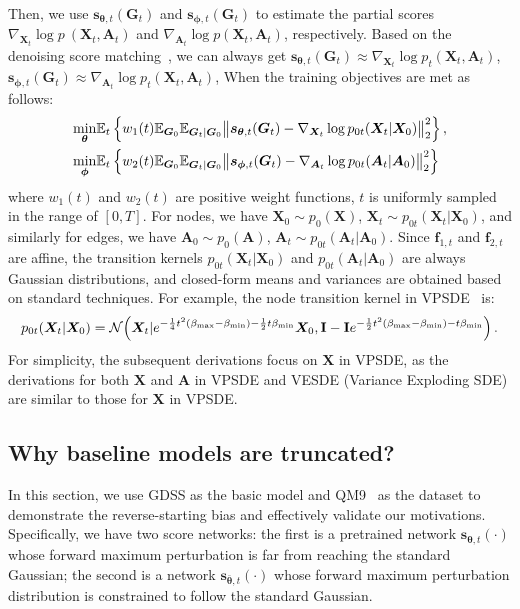 \documentclass{article}
\newcommand{\s}{{{\bm s}}}
\newcommand{\X}{{{\bm X}}}
\newcommand{\A}{{{\bm A}}}
\newcommand{\G}{{{\bm G}}}
\newcommand{\PHI}{{\bm\phi}}
\newcommand{\THETA}{{\bm\theta}}
\begin{document}
Then, we use $\s_{\THETA,t}(\G_{t})$ and $\s_{\PHI,t}(\G_{t})$ to estimate the partial scores $\nabla_{\X_t}\log p~\left(\X_t,{\A}_t\right)$ and $\nabla_{{\A}_t}\log p\left(\X_t,{\A}_t\right)$, respectively. Based on the denoising score matching~\citep{vincent2011connection,song2021scorebased}, we can always get $\s_{\THETA,t}(\G_{t})\approx\nabla_{\X_{t}}\log p_{t}(\X_{t},\A_t)$, $\s_{\PHI,t}(\G_{t})\approx\nabla_{{\A}_{t}}\log p_{t}(\X_{t},\A_t)$, When the training objectives are met as follows:
\begin{equation}
\begin{aligned}
\min_{\THETA} 
&\mathbb{E}_{t}\, \Bigl\{ w_{1}(t) \mathbb{E}_{\G_{0}} \mathbb{E}_{\G_{t}|\G_{0}} \bigl\| \s_{\THETA,t}(\G_{t}) - \nabla_{\X_{t}} \log p_{0t}(\X_{t}|\X_{0}) \bigr\|_{2}^{2} \Bigr\}\,,\\
\min_{\PHI} 
&\mathbb{E}_{t}\, \Bigl\{ w_{2}(t) \mathbb{E}_{\G_{0}} \mathbb{E}_{\G_{t}|\G_{0}} \bigl\| \s_{\PHI,t}(\G_{t}) - \nabla_{{\A}_{t}} \log p_{0t}({\A}_{t}|{\A}_{0}) \bigr\|_{2}^{2} \Bigr\}
\end{aligned}
\label{eq:combined}
\end{equation}
where $w_{1}(t)$ and $w_{2}(t)$ are positive weight functions, $t$ is uniformly sampled in the range of $[0,T]$. For nodes, we have $\X_{0} \sim p_{0}(\X)$, $\X_{t} \sim p_{0t}(\X_{t}|\X_{0})$, and similarly for edges, we have ${\A}_{0} \sim p_{0}({\A})$, ${\A}_{t} \sim p_{0t}({\A}_{t}|{\A}_{0})$. Since $\mathbf{f}_{1,t}$ and $\mathbf{f}_{2,t}$ are affine, the transition kernels $p_{0t}(\X_{t}|\X_{0})$ and $p_{0t}({\A}_{t}|{\A}_{0})$ are always Gaussian distributions, and closed-form means and variances are obtained based on standard techniques. For example, the node transition kernel in VPSDE~\citep{song2021scorebased} is:
\begin{align}
p_{0t}(\X_t | \X_0) 
= \mathcal{N}
\Bigl(\X_t| e^{-\frac14t^2(\beta_{\max}-\beta_{\min}) 
- \frac12t\beta_{\min}}\X_0, 
\mathbf{I} - \mathbf{I}e^{-\frac12t^2(\beta_{\max}
-\beta_{\min}) - t\beta_{\min}}\Bigr)\,.
\label{eq:vp perturbation kernel}
\end{align}
For simplicity, the subsequent derivations focus on $\X$ in VPSDE, as the derivations for both $\X$ and $\A$ in VPSDE and VESDE (Variance Exploding SDE) are similar to those for $\X$ in VPSDE.
\subsection{Why baseline models are truncated?} 
In this section, we use GDSS as the basic model and QM9~\citep{ramakrishnan2014quantum} as the dataset to demonstrate the reverse-starting bias and effectively validate our motivations. Specifically, we have two score networks: the first is a pretrained network $\s_{\THETA,t}(\cdot)$ whose forward maximum perturbation is far from reaching the standard Gaussian; the second is a network $\s_{\bar{\THETA},t}(\cdot)$ whose forward maximum perturbation distribution is constrained to follow the standard Gaussian. 
\end{document}
